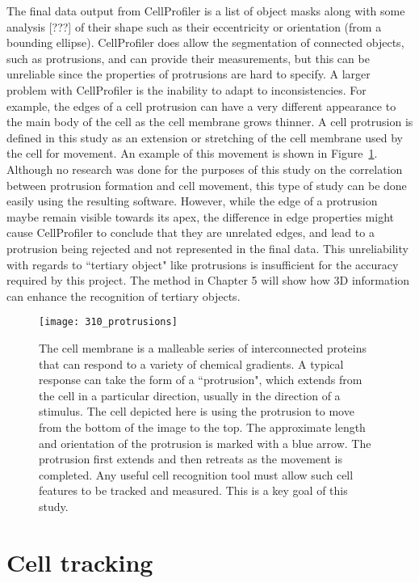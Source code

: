 The final data output from CellProfiler is a list of object masks along with some analysis [???] of their shape such as their eccentricity or orientation (from a bounding ellipse). CellProfiler does allow the segmentation of connected objects, such as protrusions, and can provide their measurements, but this can be unreliable since the properties of protrusions are hard to specify. A larger problem with CellProfiler is the inability to adapt to inconsistencies. For example, the edges of a cell protrusion can have a very different appearance to the main body of the cell as the cell membrane grows thinner. A cell protrusion is defined in this study as an extension or stretching of the cell membrane used by the cell for movement. An example of this movement is shown in Figure~\ref{fig:cellprotrusions}. Although no research was done for the purposes of this study on the correlation between protrusion formation and cell movement, this type of study can be done easily using the resulting software. However, while the edge of a protrusion maybe remain visible towards its apex, the difference in edge properties might cause CellProfiler to conclude that they are unrelated edges, and lead to a protrusion being rejected and not represented in the final data. This unreliability with regards to ``tertiary object" like protrusions is insufficient for the accuracy required by this project. The method in Chapter 5 will show how 3D information can enhance the recognition of tertiary objects.

\begin{figure}[h!]
 \centering
 \texttt{[image: 310\_protrusions]}
 \caption[Cell protrusion example]{
 	The cell membrane is a malleable series of interconnected proteins that can respond to a variety of chemical gradients. A typical response can take the form of a ``protrusion", which extends from the cell in a particular direction, usually in the direction of a stimulus. The cell depicted here is using the protrusion to move from the bottom of the image to the top. The approximate length and orientation of the protrusion is marked with a blue arrow. The protrusion first extends and then retreats as the movement is completed. Any useful cell recognition tool must allow such cell features to be tracked and measured. This is a key goal of this study.
 }
 \label{fig:cellprotrusions}
\end{figure}

\section{Cell tracking}

